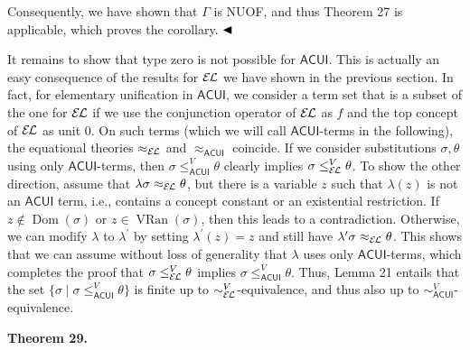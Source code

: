  
 
Consequently, we have shown that $\Gamma$ is NUOF, and thus Theorem 27 is applicable, which proves the corollary. $\hfill\blacktriangleleft$\par
 
 
 
It remains to show that type zero is not possible for $\mathsf{ACUI}$. This is actually an easy consequence of the results for $\mathcal{E\mkern-1.618muL}$ we have shown in the previous section. In fact, for elementary unification in $\mathsf{ACUI}$, we consider a term set that is a subset of the one for $\mathcal{E\mkern-1.618muL}$ if we use the conjunction operator of $\mathcal{E\mkern-1.618muL}$ as $f$ and the top concept of $\mathcal{E\mkern-1.618muL}$ as unit $0$. On such terms (which we will call $\mathsf{ACUI}$-terms in the following), the equational theories $\approx_{\mathcal{E\mkern-1.618muL}}$ and $\approx_{\mathsf{ACUI}}$ coincide. If we consider substitutions $\sigma,\theta$ using only $\mathsf{ACUI}$-terms, then $\sigma\leq_{\mathsf{ACUI}}^{V}\theta$ clearly implies $\sigma\leq_{\mathcal{E\mkern-1.618muL}}^{V}\theta$. To show the other direction, assume that $\lambda\sigma\approx_{\mathcal{E\mkern-1.618muL}}\theta$, but there is a variable $z$ such that $\lambda(z)$ is not an $\mathsf{ACUI}$ term, i.e., contains a concept constant or an existential restriction. If $z\not\in\operatorname{Dom}(\sigma)$ or $z\in\operatorname{VRan}(\sigma)$, then this leads to a contradiction. Otherwise, we can modify $\lambda$ to $\lambda^{\prime}$ by setting $\lambda^{\prime}(z)=z$ and still have $\lambda^{\prime}\sigma\approx_{\mathcal{E\mkern-1.618muL}}\theta$. This shows that we can assume without loss of generality that $\lambda$ uses only $\mathsf{ACUI}$-terms, which completes the proof that $\sigma\leq_{\mathcal{E\mkern-1.618muL}}^{V}\theta$ implies $\sigma\leq_{\mathsf{ACUI}}^{V}\theta$. Thus, Lemma 21 entails that the set $\{\sigma\mid\sigma\leq_{\mathsf{ACUI}}^{V}\theta\}$ is finite up to $\sim_{\mathcal{E\mkern-1.618muL}}^{V}$-equivalence, and thus also up to $\sim_{\mathsf{ACUI}}^{V}$-equivalence.\par
 
 
 
\par\medskip\noindent\textbf{Theorem 29.}\par
 
